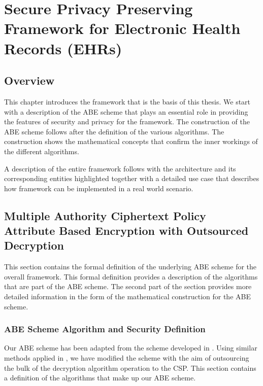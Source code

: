 \chapter{Secure Privacy Preserving Framework for Electronic Health Records (EHRs)}
\label{chap:framework_and_system_description}

\renewcommand{\theenumi}{\Alph{enumi}}
\renewcommand{\theenumii}{\roman{enumii}}


\section{Overview}

This chapter introduces the framework that is the basis of this thesis. We start with a description of the ABE scheme that plays an essential role in providing the features of security and privacy for the framework. The construction of the ABE scheme follows after the definition of the various algorithms. The construction shows the mathematical concepts that confirm the inner workings of the different algorithms.

A description of the entire framework follows with the architecture and its corresponding entities highlighted together with a detailed use case that describes how framework can be implemented in a real world scenario.


\section{Multiple Authority Ciphertext Policy Attribute Based Encryption with Outsourced Decryption}

This section contains the formal definition of the underlying ABE scheme for the overall framework. This formal definition provides a description of the algorithms that are part of the ABE scheme. The second part of the section provides more detailed information in the form of the mathematical construction for the ABE scheme.

\subsection{ABE Scheme Algorithm and Security Definition}

Our ABE scheme has been adapted from the scheme developed in \cite{Yang2014}. Using similar methods applied in \cite{Green2011outsource}, we have modified the scheme with the aim of outsourcing the bulk of the decryption algorithm operation to the CSP. This section contains a definition of the algorithms that make up our ABE scheme.

